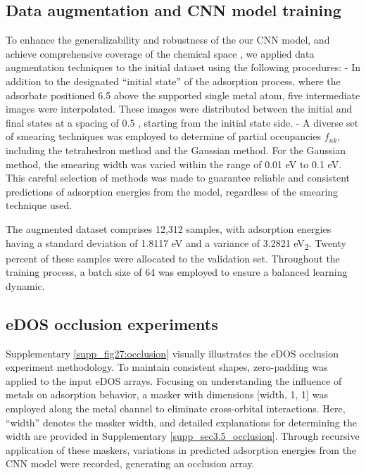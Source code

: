     \subsection{Data augmentation and CNN model training}
    To enhance the generalizability and robustness of the our CNN model, and achieve comprehensive coverage of the chemical space \cite{DBLP:journals/corr/abs-2112-12542}, we applied data augmentation techniques to the initial dataset using the following procedures:
        - In addition to the designated ``initial state'' of the adsorption process, where the adsorbate positioned 6.5 \text{\AA} above the supported single metal atom, five intermediate images were interpolated.
        These images were distributed between the initial and final states at a spacing of 0.5 \text{\AA}, starting from the initial state side.
        - A diverse set of smearing techniques was employed to determine of partial occupancies $f_{nk}$, including the tetrahedron method \cite{blochl1994improved} and the Gaussian method.
        For the Gaussian method, the smearing width was varied within the range of 0.01 eV to 0.1 eV.
        This careful selection of methods was made to guarantee reliable and consistent predictions of adsorption energies from the model, regardless of the smearing technique used.

    The augmented dataset comprises 12,312 samples, with adsorption energies having a standard deviation of 1.8117 eV and a variance of 3.2821 eV\textsubscript{2}.
    Twenty percent of these samples were allocated to the validation set.
    Throughout the training process, a batch size of 64 was employed to ensure a balanced learning dynamic.


    \subsection{eDOS occlusion experiments}
    Supplementary \cref{supp_fig27:occlusion} visually illustrates the eDOS occlusion experiment methodology.
    To maintain consistent shapes, zero-padding was applied to the input eDOS arrays.
    Focusing on understanding the influence of metals on adsorption behavior, a masker with dimensions [width, 1, 1] was employed along the metal channel to eliminate cross-orbital interactions.
    Here, ``width'' denotes the masker width, and detailed explanations for determining the width are provided in Supplementary \cref{supp_sec3.5_occlusion}.
    Through recursive application of these maskers, variations in predicted adsorption energies from the CNN model were recorded, generating an occlusion array.


